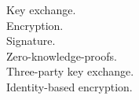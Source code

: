 \documentclass[preview]{standalone}
\begin{document}
Key exchange.\\Encryption.\\Signature.\\Zero-knowledge-proofs.\\Three-party key exchange.\\Identity-based encryption.\\
\end{document}
